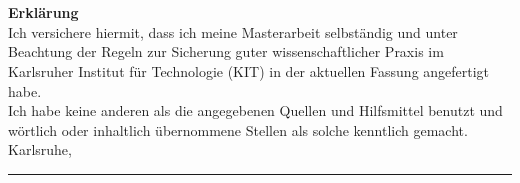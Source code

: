 \chapter*{}
\begin{flushleft}
\vspace{5cm}
\textbf{Erklärung}\\[0,5cm]
Ich versichere hiermit, dass ich meine Masterarbeit selbständig und unter Beachtung der Regeln zur Sicherung guter wissenschaftlicher Praxis im Karlsruher Institut für Technologie (KIT) in der aktuellen Fassung angefertigt habe. \\
Ich habe keine anderen als die angegebenen Quellen und Hilfsmittel benutzt und wörtlich oder inhaltlich übernommene Stellen als solche kenntlich gemacht.\\[1cm]

Karlsruhe, \abgabe\\[2cm]

\rule{5cm}{0.4pt} \\

\diplomand

\end{flushleft}
